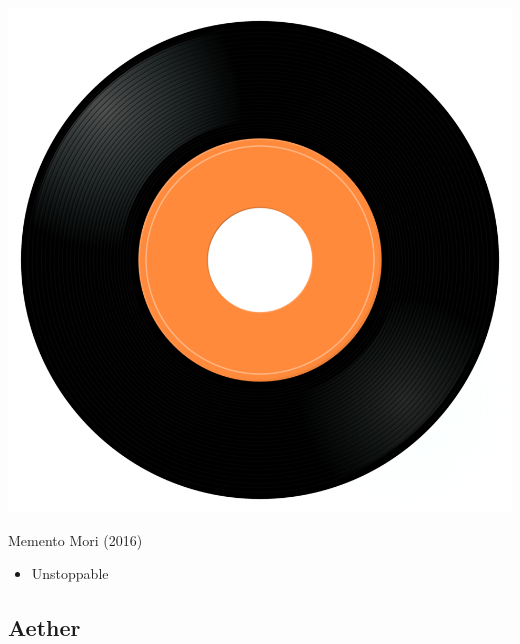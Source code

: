 \begin{minipage}[t]{0.25\textwidth}\vspace{0pt}
\captionsetup{type=figure}
\includegraphics[width=\textwidth]{Images/cover.png}
\caption*{Memento Mori (2016)}
\end{minipage}
\begin{minipage}[t]{0.25\textwidth}\vspace{0pt}
\begin{itemize}[nosep,leftmargin=1em,labelwidth=*,align=left]
	\setlength{\itemsep}{0pt}
	\item Unstoppable
\end{itemize}
\end{minipage}

\subsection{Aether}

